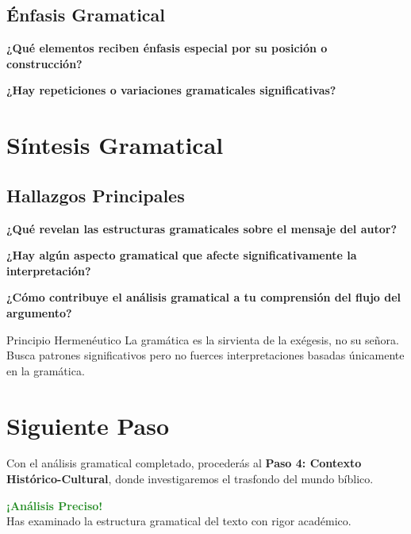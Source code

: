 \documentclass[11pt,a4paper]{article}
\begin{document}
\subsection{Énfasis Gramatical}

\textbf{¿Qué elementos reciben énfasis especial por su posición o construcción?}
\vspace{3cm}

\textbf{¿Hay repeticiones o variaciones gramaticales significativas?}
\vspace{2cm}

\section{Síntesis Gramatical}

\subsection{Hallazgos Principales}

\textbf{¿Qué revelan las estructuras gramaticales sobre el mensaje del autor?}
\vspace{3cm}

\textbf{¿Hay algún aspecto gramatical que afecte significativamente la interpretación?}
\vspace{3cm}

\textbf{¿Cómo contribuye el análisis gramatical a tu comprensión del flujo del argumento?}
\vspace{3cm}

\begin{infobox}{Principio Hermenéutico}
La gramática es la sirvienta de la exégesis, no su señora. Busca patrones significativos pero no fuerces interpretaciones basadas únicamente en la gramática.
\end{infobox}

\section{Siguiente Paso}

Con el análisis gramatical completado, procederás al \textbf{Paso 4: Contexto Histórico-Cultural}, donde investigaremos el trasfondo del mundo bíblico.

\vspace{1cm}

\begin{center}
\begin{tcolorbox}[colback=mintgreen!20, colframe=mintgreen, width=0.7\textwidth]
\centering
\textcolor{forestgreen}{\textbf{¡Análisis Preciso!}}\\
\textcolor{papergray}{Has examinado la estructura gramatical del texto con rigor académico.}
\end{tcolorbox}
\end{center}
\end{document}
